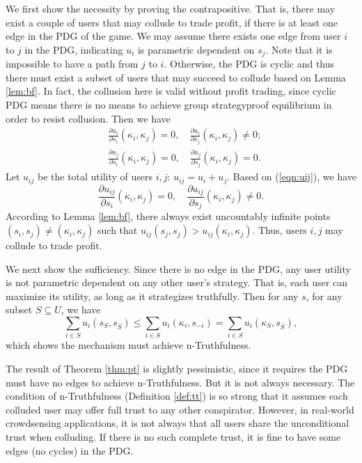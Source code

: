 \documentclass[conference]{IEEEtran}
\theoremstyle{definition}
\begin{document}
\begin{IEEEproof}
We first show the necessity by proving the contrapositive. That is, there may exist a couple of users that may collude to trade profit, if there is at least one edge in the PDG of the game. We may assume there exists one edge from user $i$ to $j$ in the PDG, indicating $u_i$ is parametric dependent on $s_j$. Note that it is impossible to have a path from $j$ to $i$. Otherwise, the PDG is cyclic and thus there must exist a subset of users that may succeed to collude based on Lemma \ref{lem:bf}. In fact, the collusion here is valid without profit trading, since cyclic PDG means there is no means to achieve group strategyproof equilibrium in order to resist collusion. Then we have
\begin{equation}
\label{eqn:uij}
\begin{aligned}
&\frac{\partial u_i}{\partial s_i}(\kappa_i,\kappa_j)=0, \quad \frac{\partial u_i}{\partial s_j}(\kappa_i,\kappa_j)\not=0;\\
&\frac{\partial u_j}{\partial s_i}(\kappa_i,\kappa_j)=0, \quad \frac{\partial u_j}{\partial s_j}(\kappa_i,\kappa_j)=0.
\end{aligned}
\end{equation}
Let $u_{ij}$ be the total utility of users $i,j$: $u_{ij}=u_i+u_j$. Based on (\ref{eqn:uij}), we have
\begin{equation}
\frac{\partial u_{ij}}{\partial s_i}(\kappa_i,\kappa_j)=0, \quad \frac{\partial u_{ij}}{\partial s_j}(\kappa_i,\kappa_j)\not=0.
\end{equation}
According to Lemma \ref{lem:bf}, there always exist uncountably infinite points $(s_i,s_j)\not=(\kappa_i,\kappa_j)$ such that $u_{ij}(s_j,s_j)>u_{ij}(\kappa_i,\kappa_j)$. Thus, users $i,j$ may collude to trade profit.

We next show the sufficiency. Since there is no edge in the PDG, any user utility is not parametric dependent on any other user\rq{}s strategy. That is, each user can maximize its utility, as long as it strategizes truthfully. Then for any $s$, for any subset $S\subseteq U$, we have
\begin{equation}
\sum_{i\in S}u_i(s_S,s_{\overline{S}})\leq \sum_{i\in S}u_i(\kappa_i,s_{-i}) = \sum_{i\in S}u_i(\kappa_S,s_{\overline{S}}),
\end{equation}
which shows the mechanism must achieve n-Truthfulness.
\end{IEEEproof}
{\color{black}
The result of Theorem \ref{thm:pt} is slightly pessimistic, since it requires the PDG must have no edges to achieve n-Truthfulness. But it is not always necessary. The condition of n-Truthfulness (Definition \ref{def:tt}) is so strong that it assumes each colluded user may offer full trust to any other conspirator. However, in real-world crowdsensing applications, it is not always that all users share the unconditional trust when colluding. If there is no such complete trust, it is fine to have some edges (no cycles) in the PDG.
}
\end{document}
